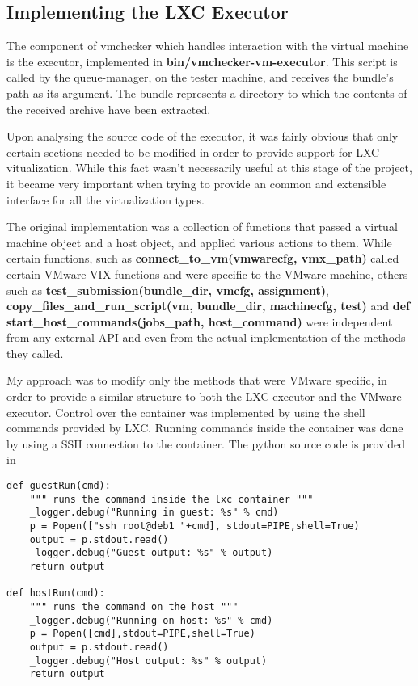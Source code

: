 \subsection{Implementing the LXC Executor}
\label{sub-sec:vmc-lxc-executor}

The component of vmchecker which handles interaction with the virtual machine 
is the executor, implemented in \textbf{bin/vmchecker-vm-executor}. This script
is called by the queue-manager, on the tester machine, and receives the bundle's
path as its argument. The bundle represents a directory to which the contents
of the received archive have been extracted.

Upon analysing the source code of the executor, it was fairly obvious that
only certain sections needed to be modified in order to provide support for
LXC vitualization. While this fact wasn't necessarily useful at this stage
of the project, it became very important when trying to provide an common and
extensible interface for all the virtualization types.

The original implementation was a collection of functions that passed a 
virtual machine object and a host object, and applied various actions to them.
While certain functions, such as \textbf{connect_to_vm(vmwarecfg, vmx_path)}
called certain VMware VIX functions and were specific to the VMware machine,
others such as \textbf{test_submission(bundle_dir, vmcfg, assignment)}, 
\textbf{copy_files_and_run_script(vm, bundle_dir, machinecfg, test)} and 
\textbf{def start_host_commands(jobs_path, host_command)} were independent
from any external API and even from the actual implementation of the 
methods they called.

My approach was to modify only the methods that were VMware specific, in order
to provide a similar structure to both the LXC executor and the VMware executor.
Control over the container was implemented by using the shell commands
provided by LXC. Running commands inside the container was done by using a 
SSH connection to the container. The python source code is 
provided in 

\lstset{caption=Running Commands,language=python,label=lst:lxc-commands}
\begin{lstlisting}
def guestRun(cmd):
    """ runs the command inside the lxc container """
    _logger.debug("Running in guest: %s" % cmd)
    p = Popen(["ssh root@deb1 "+cmd], stdout=PIPE,shell=True)
    output = p.stdout.read()
    _logger.debug("Guest output: %s" % output)
    return output

def hostRun(cmd):
    """ runs the command on the host """
    _logger.debug("Running on host: %s" % cmd)
    p = Popen([cmd],stdout=PIPE,shell=True)
    output = p.stdout.read()
    _logger.debug("Host output: %s" % output)
    return output
\end{lstlisting}

